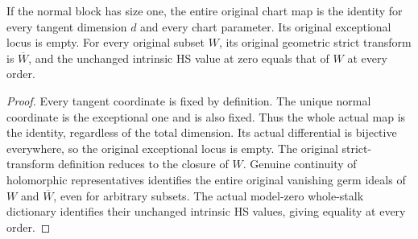 \begin{theorem}
\label{hir:actual-normal-blowup-codimension-one-identity}
If the normal block has size one, the entire original chart map is
the identity for every tangent dimension $d$ and every chart parameter.
Its original exceptional locus is empty. For every original subset
$W$, its original geometric strict transform is $\overline W$,
and the unchanged intrinsic HS value at zero equals that of $W$ at
every order.
\leanok
\end{theorem}
\begin{proof}
Every tangent coordinate is fixed by definition. The unique normal
coordinate is the exceptional one and is also fixed. Thus the whole
actual map is the identity, regardless of the total dimension. Its
actual differential is bijective everywhere, so the original
exceptional locus is empty. The original strict-transform definition
reduces to the closure of $W$. Genuine continuity of holomorphic
representatives identifies the entire original vanishing germ ideals
of $W$ and $\overline W$, even for arbitrary subsets. The actual
model-zero whole-stalk dictionary identifies their unchanged intrinsic
HS values, giving equality at every order.
\end{proof}

